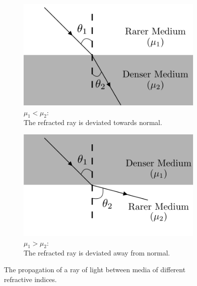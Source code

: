 \begin{refsection}
\begin{figure}[!htb]
\captionsetup[subfigure]{justification=centering}
\centering
        \begin{subfigure}[b]{0.5\textwidth}
        \centering
                \includegraphics[scale=0.5]{figs/snell1.png}
                \caption{$\mu_1<\mu_2:$\\ The refracted ray is deviated towards normal.}
                \label{fig:rareToDense}
        \end{subfigure}\hfill
        \begin{subfigure}[b]{0.5\textwidth}
        \centering
                \includegraphics[scale=0.5]{figs/snell2.png}
                \caption{$\mu_1>\mu_2:$\\ The refracted ray is deviated away from normal.}
                \label{fig:denseToRare}
        \end{subfigure}
        \par\bigskip
        \caption{The propagation of a ray of light between media of different refractive indices.}\label{fig:snells}
\end{figure}



\end{refsection}
